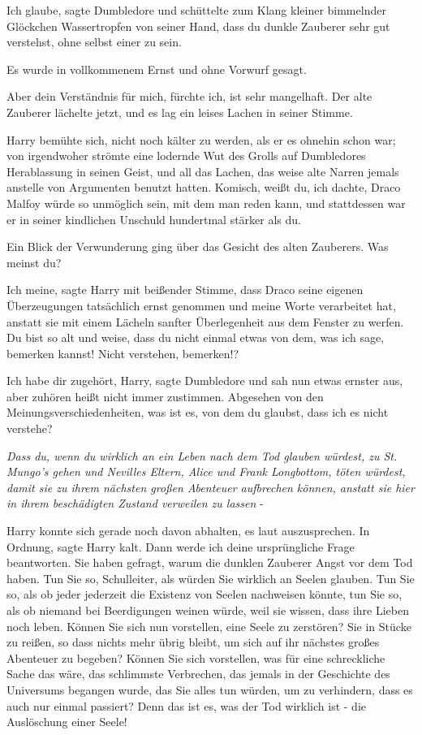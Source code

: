 \glqq{}Ich glaube\grqq{}, sagte Dumbledore und schüttelte zum Klang kleiner
bimmelnder Glöckchen Wassertropfen von seiner Hand, \glqq{}dass du dunkle
Zauberer sehr gut verstehst, ohne selbst einer zu sein.\grqq{}

Es wurde in vollkommenem Ernst und ohne Vorwurf gesagt.

\glqq{}Aber dein Verständnis für mich, fürchte ich, ist sehr mangelhaft.\grqq{}
Der alte Zauberer lächelte jetzt, und es lag ein leises Lachen in seiner Stimme.

Harry bemühte sich, nicht noch kälter zu werden, als er es ohnehin schon war;
von irgendwoher strömte eine lodernde Wut des Grolls auf Dumbledores
Herablassung in seinen Geist, und all das Lachen, das weise alte Narren jemals
anstelle von Argumenten benutzt hatten. \glqq{}Komisch, weißt du, ich dachte,
Draco Malfoy würde so unmöglich sein, mit dem man reden kann, und stattdessen
war er in seiner kindlichen Unschuld hundertmal stärker als du.\grqq{}

Ein Blick der Verwunderung ging über das Gesicht des alten Zauberers. \glqq{}Was
meinst du?\grqq{}

\glqq{}Ich meine\grqq{}, sagte Harry mit beißender Stimme, \glqq{}dass Draco seine
eigenen Überzeugungen tatsächlich ernst genommen und meine Worte verarbeitet
hat, anstatt sie mit einem Lächeln sanfter Überlegenheit aus dem Fenster zu
werfen. Du bist so alt und weise, dass du nicht einmal etwas von dem, was ich
sage, bemerken kannst! Nicht verstehen, bemerken!?\grqq{}

\glqq{}Ich habe dir zugehört, Harry\grqq{}, sagte Dumbledore und sah nun etwas
ernster aus, \glqq{}aber zuhören heißt nicht immer zustimmen. Abgesehen von den
Meinungsverschiedenheiten, was ist es, von dem du glaubst, dass ich es nicht
verstehe?\grqq{}

\emph{Dass du, wenn du wirklich an ein Leben nach dem Tod glauben würdest, zu
St. Mungo's gehen und Nevilles Eltern, Alice und Frank Longbottom, töten
würdest, damit sie zu ihrem nächsten großen Abenteuer aufbrechen können, anstatt
sie hier in ihrem beschädigten Zustand verweilen zu lassen} -

Harry konnte sich gerade noch davon abhalten, es laut auszusprechen. \glqq{}In
Ordnung\grqq{}, sagte Harry kalt. \glqq{}Dann werde ich deine ursprüngliche Frage
beantworten. Sie haben gefragt, warum die dunklen Zauberer Angst vor dem Tod
haben. Tun Sie so, Schulleiter, als würden Sie wirklich an Seelen glauben. Tun
Sie so, als ob jeder jederzeit die Existenz von Seelen nachweisen könnte, tun
Sie so, als ob niemand bei Beerdigungen weinen würde, weil sie wissen, dass ihre
Lieben noch leben. Können Sie sich nun vorstellen, eine Seele zu zerstören? Sie
in Stücke zu reißen, so dass nichts mehr übrig bleibt, um sich auf ihr nächstes
großes Abenteuer zu begeben? Können Sie sich vorstellen, was für eine
schreckliche Sache das wäre, das schlimmste Verbrechen, das jemals in der
Geschichte des Universums begangen wurde, das Sie alles tun würden, um zu
verhindern, dass es auch nur einmal passiert? Denn das ist es, was der Tod
wirklich ist - die Auslöschung einer Seele!\grqq{}

